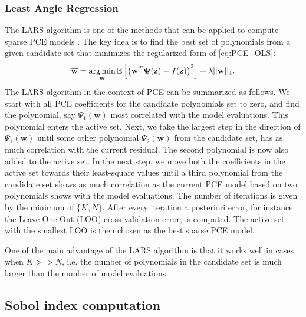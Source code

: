 \subsubsection{Least Angle Regression}
The LARS algorithm \cite{efron2004} is one of the methods that can be applied to compute sparse PCE models \cite{BlatmanThesis, BLATMAN2011}. The key idea is to find the best set of polynomials from a given candidate set that minimizes the regularized form of \eqref{eq:PCE_OLS}:
\begin{equation}\label{regularized_LS}
\mathbf{\overline{w}} = \operatorname*{arg\,min}_{\mathbf{w}} \mathbb{E}\left[\left(\mathbf{w}^T \boldsymbol{\Psi}(\mathbf{z}) - f(\mathbf{z})\right)^2\right] + \lambda ||\mathbf{w}||_1.
\end{equation}
The LARS algorithm in the context of PCE can be summarized as follows. We start with all PCE coefficients for the candidate polynomials set to zero, and find the polynomial, say $\Psi_1(\mathbf{w})$ most correlated with the model evaluations. This polynomial enters the active set. Next, we take the largest step in the direction of $\Psi_1(\mathbf{w})$ until some other polynomial $\Psi_2(\mathbf{w})$ from the candidate set, has as much correlation with the current residual. The second polynomial is now also added to the active set. In the next step, we move both the coefficients in the active set towards their least-square values until a third polynomial from the candidate set shows as much correlation as the current PCE model based on two polynomials shows with the model evaluations. The number of iterations is given by the minimum of $\{K,N\}$. After every iteration a posteriori error, for instance the Leave-One-Out (LOO) cross-validation error, is computed. The active set with the smallest LOO is then chosen as the best sparse PCE model.

One of the main advantage of the LARS algorithm is that it works well in cases when $K>>N$, i.e. the number of polynomials in the candidate set is much larger than the number of model evaluations.

\subsection{Sobol index computation}


